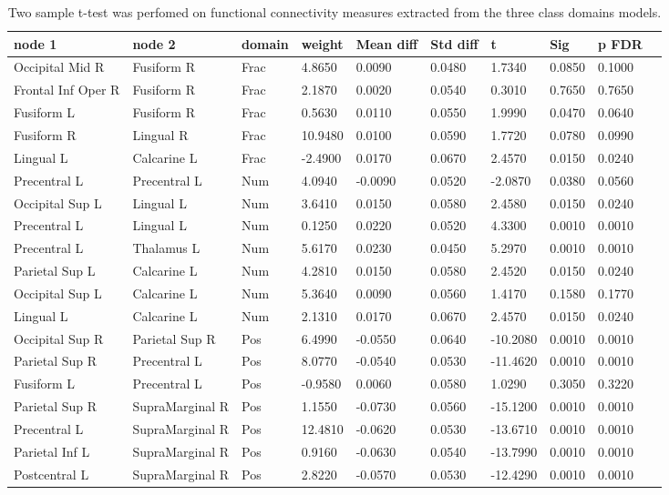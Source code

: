 \begin{table}
\centering
\begin{tabular}[0.2em]{@{}llllllllll@{}}\toprule
node 1 & node 2 & domain & weight & Mean diff & Std diff & t & Sig & p FDR\\\toprule[0.2em]
Occipital Mid R & Fusiform R & Frac & 4.8650 & 0.0090 & 0.0480 & 1.7340 & 0.0850 & 0.1000 \\\midrule
Frontal Inf Oper R & Fusiform R & Frac & 2.1870 & 0.0020 & 0.0540 & 0.3010 & 0.7650 & 0.7650 \\\midrule
Fusiform L & Fusiform R & Frac & 0.5630 & 0.0110 & 0.0550 & 1.9990 & 0.0470 & 0.0640 \\\midrule
Fusiform R & Lingual R & Frac & 10.9480 & 0.0100 & 0.0590 & 1.7720 & 0.0780 & 0.0990 \\\midrule
Lingual L & Calcarine L & Frac & -2.4900 & 0.0170 & 0.0670 & 2.4570 & 0.0150 & 0.0240 \\\midrule
Precentral L & Precentral L & Num & 4.0940 & -0.0090 & 0.0520 & -2.0870 & 0.0380 & 0.0560 \\\midrule
Occipital Sup L & Lingual L & Num & 3.6410 & 0.0150 & 0.0580 & 2.4580 & 0.0150 & 0.0240 \\\midrule
Precentral L & Lingual L & Num & 0.1250 & 0.0220 & 0.0520 & 4.3300 & 0.0010 & 0.0010 \\\midrule
Precentral L & Thalamus L & Num & 5.6170 & 0.0230 & 0.0450 & 5.2970 & 0.0010 & 0.0010 \\\midrule
Parietal Sup L & Calcarine L & Num & 4.2810 & 0.0150 & 0.0580 & 2.4520 & 0.0150 & 0.0240 \\\midrule
Occipital Sup L & Calcarine L & Num & 5.3640 & 0.0090 & 0.0560 & 1.4170 & 0.1580 & 0.1770 \\\midrule
Lingual L & Calcarine L & Num & 2.1310 & 0.0170 & 0.0670 & 2.4570 & 0.0150 & 0.0240 \\\midrule
Occipital Sup R & Parietal Sup R & Pos & 6.4990 & -0.0550 & 0.0640 & -10.2080 & 0.0010 & 0.0010 \\\midrule
Parietal Sup R & Precentral L & Pos & 8.0770 & -0.0540 & 0.0530 & -11.4620 & 0.0010 & 0.0010 \\\midrule
Fusiform L & Precentral L & Pos & -0.9580 & 0.0060 & 0.0580 & 1.0290 & 0.3050 & 0.3220 \\\midrule
Parietal Sup R & SupraMarginal R & Pos & 1.1550 & -0.0730 & 0.0560 & -15.1200 & 0.0010 & 0.0010 \\\midrule
Precentral L & SupraMarginal R & Pos & 12.4810 & -0.0620 & 0.0530 & -13.6710 & 0.0010 & 0.0010 \\\midrule
Parietal Inf L & SupraMarginal R & Pos & 0.9160 & -0.0630 & 0.0540 & -13.7990 & 0.0010 & 0.0010 \\\midrule
Postcentral L & SupraMarginal R & Pos & 2.8220 & -0.0570 & 0.0530 & -12.4290 & 0.0010 & 0.0010 \\\bottomrule[0.2em]
\end{tabular}
\caption{Two sample t-test was perfomed on functional connectivity measures extracted from the three class domains models.\label{tabel:TTestFinal}}
\end{table}
